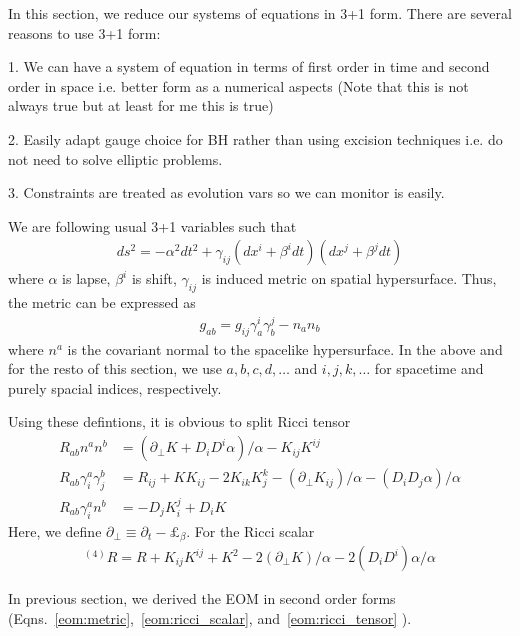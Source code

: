 \documentclass[a4paper,oneside,openany,11pt]{memoir}
\numberwithin{equation}{section} %
\newcommand{\aaron}[1]{{\color{cyan} #1}}
\begin{document}
In this section, we reduce our systems of equations in 3+1 form. There are several reasons to use 3+1 form:

1. We can have a system of equation in terms of first order in time and second order in space i.e. better form
as a numerical aspects (Note that this is not always true but at least for me this is true)

2. Easily adapt gauge choice for BH rather than using excision techniques i.e. do not need to solve elliptic problems.

3. Constraints are treated as evolution vars so we can monitor is easily.

We are following usual 3+1 variables such that
\begin{align}
\label{eqn:3p1}
ds^2 = -\alpha^2 dt^2 + \gamma_{ij} (dx^i + \beta^i dt)(dx^j + \beta^j dt)
\end{align}
where $\alpha$ is lapse, $\beta^i$ is shift, $\gamma_{ij}$ is induced metric on spatial hypersurface.
Thus, the metric can be expressed as
\begin{align}
g_{ab} = g_{ij}\gamma^i_a \gamma^j_b - n_a n_b
\end{align}
where $n^a$ is the covariant normal to the spacelike hypersurface. \aaron{In the above and for the resto of this section, we use $a,b,c,d,\dots$ and $i,j,k,\dots$ for spacetime and purely spacial indices, respectively.}

Using these defintions, it is obvious to split Ricci tensor
\begin{align}
\label{ricci3p1}
R_{ab} n^a n^b &= (\partial_\bot K + D_i D^i \alpha)/\alpha - K_{ij} K^{ij} \\
R_{ab} \gamma^a_i \gamma^b_j &= R_{ij} + K K_{ij} - 2 K_{ik} K^{k}_j - (\partial_\bot K_{ij})/\alpha
-(D_i D_j \alpha)/\alpha \\
R_{ab} \gamma^a_i n^b &= - D_j K^j_i + D_i K
\end{align}
Here, we define $\partial_\bot \equiv \partial_t - \pounds_\beta$. For the Ricci scalar
\begin{align}
^{(4)}R = R + K_{ij} K^{ij} + K^2 - 2 (\partial_\bot K) /\alpha - 2 (D_i D^i) \alpha / \alpha
\end{align}

In previous section, we derived the EOM in second order forms 
(Eqns.~\ref{eom:metric},~\ref{eom:ricci_scalar}, and~\ref{eom:ricci_tensor} ).
\end{document}

